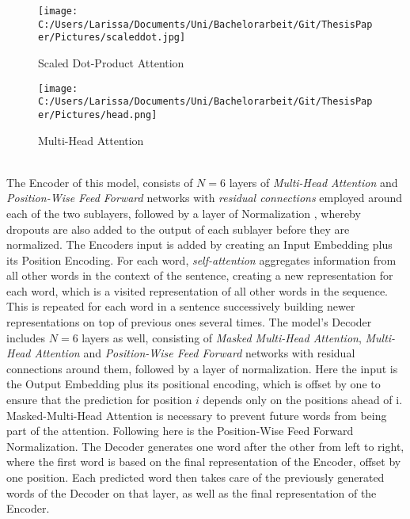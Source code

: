 \documentclass[a4paper, 11pt,titlepage,oneside,openany]{book}
\begin{document}
\begin{figure}[t]
	\begin{minipage}[b]{0.5\linewidth}
		\texttt{[image: C:/Users/Larissa/Documents/Uni/Bachelorarbeit/Git/ThesisPaper/Pictures/scaleddot.jpg]}
		\caption{Scaled Dot-Product Attention}
	\end{minipage}
	\hfill
	\begin{minipage}[b]{0.5\linewidth}
		\texttt{[image: C:/Users/Larissa/Documents/Uni/Bachelorarbeit/Git/ThesisPaper/Pictures/head.png]}
		\caption{Multi-Head Attention}
	\end{minipage}
\end{figure}
\\The Encoder of this model, consists of $N=6$ layers of \textit{Multi-Head Attention} and \textit{Position-Wise Feed Forward} networks with \textit{residual connections} \cite{residualcon} employed around each of the two sublayers, followed by a layer of Normalization \cite{normalization}, whereby dropouts \cite{dopout} are also added to the output of each sublayer before they are normalized. The Encoders input is added by creating an Input Embedding plus its Position Encoding. For each word, \textit{self-attention} aggregates information from all other words in the context of the sentence, creating a new representation for each word, which is a visited representation of all other words in the sequence. This is repeated for each word in a sentence  successively building newer representations on top of previous ones several times.
\noindent The model's Decoder includes $N=6$ layers as well, consisting of \textit{Masked Multi-Head Attention}, \textit{Multi-Head Attention} and \textit{Position-Wise Feed Forward} networks with residual connections around them, followed by a layer of normalization. Here the input is the Output Embedding plus its positional encoding, which is offset by one to ensure that the prediction for position $i$ depends only on the positions ahead of i. Masked-Multi-Head Attention is necessary to prevent future words from being part of the attention. Following here is the Position-Wise Feed Forward Normalization. The Decoder generates one word after the other from left to right, where the first word is based on the final representation of the Encoder, offset by one position. Each predicted word then takes care of the previously generated words of the Decoder on that layer, as well as the final representation of the Encoder.
\end{document}
